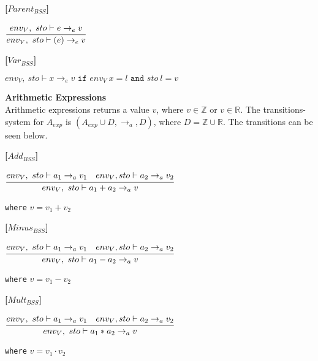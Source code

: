 \textbf{[$Parent_{BSS}$]}
\begin{center}
	\begin{math}
	\cfrac
		{env_V,\ sto \vdash e \rightarrow_e v}
		{env_V,\ sto \vdash (e) \rightarrow_e v}
	\end{math}
\end{center}

\textbf{[$Var_{BSS}$]}
\begin{center}
	\begin{math}
	env_V,\ sto \vdash x \rightarrow_e v
	\texttt{ if } env_V\ x = l
	\texttt{ and } sto\ l = v
	\end{math}
\end{center}

\textbf{\large{Arithmetic Expressions}}\\
Arithmetic expressions returns a value $v$, where $v \in \mathbb{Z}$ or $v \in \mathbb{R}$.
The transitions-system for $A_{exp}$ is $(A_{exp} \cup D, \rightarrow_a, D)$, 
where $D = \mathbb{Z} \cup \mathbb{R}$.
The transitions can be seen below.

\textbf{[$Add_{BSS}$]}\\
\begin{center}
	\begin{math}
	\cfrac
		{env_V,\ sto \vdash a_1 \rightarrow_a v_1 \quad env_V, sto \vdash a_2 \rightarrow_a v_2}
		{env_V,\ sto \vdash a_1 + a_2 \rightarrow_a v}
	\end{math}
	
	
	\texttt{where} $v = v_1 + v_2$
\end{center}

\textbf{[$Minus_{BSS}$]}\\
\begin{center}
	\begin{math}
	\cfrac
		{env_V,\ sto \vdash a_1 \rightarrow_a v_1 \quad env_V, sto \vdash a_2 \rightarrow_a v_2}
		{env_V,\ sto \vdash a_1 - a_2 \rightarrow_a v}
	\end{math}
	
	
	\texttt{where} $v = v_1 - v_2$
\end{center}

\textbf{[$Mult_{BSS}$]}\\
\begin{center}
	\begin{math}
	\cfrac
	{env_V,\ sto \vdash a_1 \rightarrow_a v_1 \quad env_V, sto \vdash a_2 \rightarrow_a v_2}
	{env_V,\ sto \vdash a_1 * a_2 \rightarrow_a v}
	\end{math}
	
	
	\texttt{where} $v = v_1 \cdot v_2$
\end{center}

